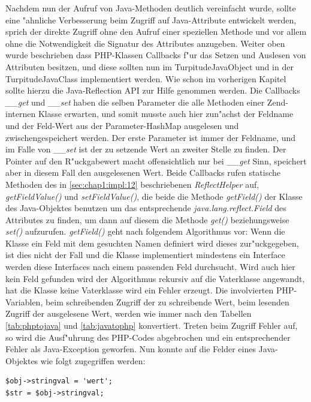 Nachdem nun der Aufruf von Java-Methoden deutlich vereinfacht wurde, sollte eine "ahnliche Verbesserung beim Zugriff auf Java-Attribute
entwickelt werden, sprich der direkte Zugriff ohne den Aufruf einer speziellen Methode und vor allem ohne die Notwendigkeit die
Signatur des Attributes anzugeben. Weiter oben wurde beschrieben dass PHP-Klassen Callbacks f"ur das Setzen und Auslesen von 
Attributen besitzen, und diese sollten nun im TurpitudeJavaObject und in der TurpitudeJavaClass implementiert werden. Wie schon
im vorherigen Kapitel sollte hierzu die Java-Reflection API zur Hilfe genommen werden. Die Callbacks \emph{\_\_get} und \emph{\_\_set}
haben die selben Parameter die alle Methoden einer Zend-internen Klasse erwarten, und somit musste auch hier zun"achst der Feldname
und der Feld-Wert aus der Parameter-HashMap ausgelesen und zwischengespeichert werden. Der erste Parameter ist immer der Feldname,
und im Falle von \emph{\_\_set} ist der zu setzende Wert an zweiter Stelle zu finden. Der Pointer auf den R"uckgabewert macht 
offensichtlich nur bei \emph{\_\_get} Sinn, speichert aber in diesem Fall den ausgelesenen Wert. Beide Callbacks rufen statische Methoden
des in \ref{sec:chap1:impl:12} beschriebenen \emph{ReflectHelper} auf, \emph{getFieldValue()} und \emph{setFieldValue()}, die beide
die Methode \emph{getField()} der Klasse des Java-Objektes benutzen um das entsprechende \emph{java.lang.reflect.Field} des Attributes 
zu finden, um dann auf diesem die Methode \emph{get()} beziehungsweise \emph{set()} aufzurufen. \emph{getField()} geht nach folgendem
Algorithmus vor: Wenn die Klasse ein Feld mit dem gesuchten Namen definiert wird dieses zur"uckgegeben, ist dies nicht der Fall und die
Klasse implementiert mindestens ein Interface werden diese Interfaces nach einem passenden Feld durchsucht. Wird auch hier kein Feld
gefunden wird der Algorithmus rekursiv auf die Vaterklasse angewandt, hat die Klasse keine Vaterklasse wird ein Fehler erzeugt.
Die involvierten PHP-Variablen, beim
schreibenden Zugriff der zu schreibende Wert, beim lesenden Zugriff der ausgelesene Wert, werden wie immer nach den Tabellen
\ref{tab:phptojava} und \ref{tab:javatophp} konvertiert. Treten beim Zugriff Fehler auf, so wird die Ausf"uhrung des PHP-Codes abgebrochen
und ein entsprechender Fehler als Java-Exception geworfen. Nun konnte auf die Felder eines Java-Objektes wie folgt zugegriffen werden:
\begin{lstlisting}[caption=Verbesserter Zugriff auf Java-Attribute]
$obj->stringval = 'wert';
$str = $obj->stringval;
\end{lstlisting}
